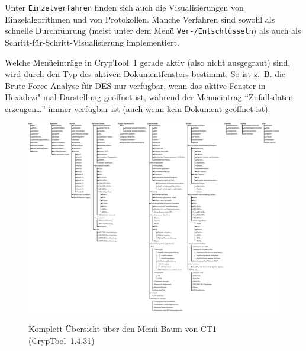 Unter \verb#Einzelverfahren# finden sich auch die Visualisierungen von Einzelalgorithmen und von Protokollen. Manche Verfahren sind sowohl als schnelle Durchführung (meist unter dem Menü \verb#Ver-/Entschlüsseln#) als auch als
Schritt-für-Schritt-Visualisierung implementiert.

Welche Menüeinträge in CrypTool~1 gerade aktiv (also nicht ausgegraut) sind,
wird durch den Typ des aktiven Dokumentfensters bestimmt:
So ist z.~B. die Brute-Force-Analyse für DES
nur verfügbar, wenn das aktive Fenster in Hexadezi"-mal-Darstellung
geöffnet ist, während der Menüeintrag "`Zufallsdaten erzeugen\dots"'
immer verfügbar ist (auch wenn kein Dokument geöffnet ist).



\clearpage
\begin{figure}
\includegraphics[scale=0.4]{figures/CT1-menutree-de}
\hypertarget{appendix-figure-menu-overview-CT1}{}
\caption{Komplett-Übersicht über den Menü-Baum von CT1 (CrypTool~1.4.31)}%
\label{appendix-figure-menu-overview-CT1}
\end{figure}


